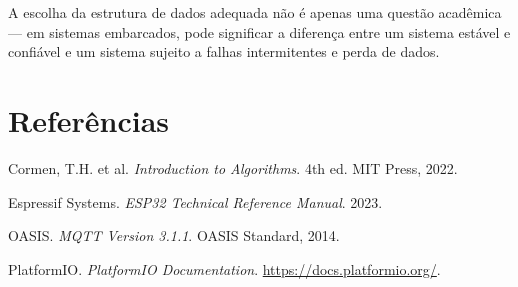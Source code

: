 \documentclass[12pt, a4paper]{article}
\begin{document}
A escolha da estrutura de dados adequada não é apenas uma questão acadêmica --- em sistemas embarcados, pode significar a diferença entre um sistema estável e confiável e um sistema sujeito a falhas intermitentes e perda de dados.

\section*{Referências}

\begin{enumerate}[label={[\arabic*]}]
    \item Cormen, T.H. et al. \textit{Introduction to Algorithms}. 4th ed. MIT Press, 2022.
    \item Espressif Systems. \textit{ESP32 Technical Reference Manual}. 2023.
    \item OASIS. \textit{MQTT Version 3.1.1}. OASIS Standard, 2014.
    \item PlatformIO. \textit{PlatformIO Documentation}. \url{https://docs.platformio.org/}.
\end{enumerate}
\end{document}
